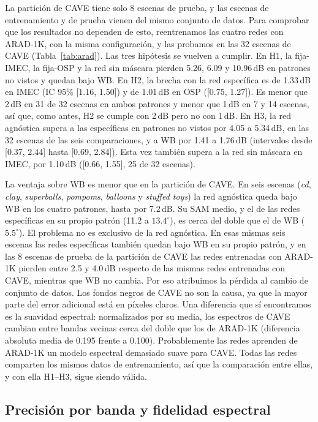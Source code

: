 \documentclass{article}
\begin{document}
La partición de CAVE tiene solo 8 escenas de prueba, y las escenas de
entrenamiento y de prueba vienen del mismo conjunto de datos. Para comprobar
que los resultados no dependen de esto, reentrenamos las cuatro redes con
ARAD-1K, con la misma configuración, y las probamos en las 32 escenas de
CAVE (Tabla~\ref{tab:arad}). Las tres hipótesis se vuelven a cumplir. En
H1, la fija-IMEC, la fija-OSP y la red sin máscara pierden 5.26, 6.09 y
10.96\,dB en patrones no vistos y quedan bajo WB. En H2, la brecha con la
red específica es de 1.33\,dB en IMEC (IC 95\% [1.16, 1.50]) y de 1.01\,dB
en OSP ([0.75, 1.27]). Es menor que 2\,dB en 31 de 32 escenas en ambos
patrones y menor que 1\,dB en 7 y 14 escenas, así que, como antes, H2 se
cumple con 2\,dB pero no con 1\,dB. En H3, la red agnóstica supera a las
específicas en patrones no vistos por 4.05 a 5.34\,dB, en las 32 escenas de
las seis comparaciones, y a WB por 1.41 a 1.76\,dB (intervalos desde [0.37,
2.44] hasta [0.69, 2.84]). Esta vez también supera a la red sin máscara en
IMEC, por 1.10\,dB ([0.66, 1.55], 25 de 32 escenas).

La ventaja sobre WB es menor que en la partición de CAVE. En seis escenas
(\textit{cd}, \textit{clay}, \textit{superballs}, \textit{pompoms},
\textit{balloons} y \textit{stuffed toys}) la red agnóstica queda bajo WB en
los cuatro patrones, hasta por 7.2\,dB. Su SAM medio, y el de las redes
específicas en su propio patrón (11.2 a $13.4^\circ$), es cerca del doble
que el de WB ($5.5^\circ$). El problema no es exclusivo de la red agnóstica.
En esas mismas seis escenas las redes específicas también quedan bajo WB en
su propio patrón, y en las 8 escenas de prueba de la partición de CAVE las
redes entrenadas con ARAD-1K pierden entre 2.5 y 4.0\,dB respecto de las
mismas redes entrenadas con CAVE, mientras que WB no cambia. Por eso
atribuimos la pérdida al cambio de conjunto de datos. Los fondos negros de
CAVE no son la causa, ya que la mayor parte del error adicional está en
píxeles claros. Una diferencia que sí encontramos es la suavidad espectral:
normalizados por su media, los espectros de CAVE cambian entre bandas
vecinas cerca del doble que los de ARAD-1K (diferencia absoluta media de
0.195 frente a 0.100). Probablemente las redes aprenden de ARAD-1K un modelo
espectral demasiado suave para CAVE. Todas las redes comparten los mismos
datos de entrenamiento, así que la comparación entre ellas, y con ella
H1--H3, sigue siendo válida.

\subsection{Precisión por banda y fidelidad espectral}
\end{document}
